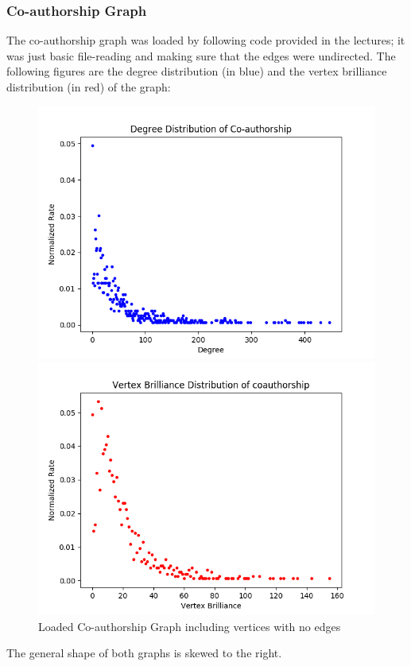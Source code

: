 \documentclass[11pt,a4paper,notitlepage]{article}
\begin{document}
\subsubsection*{Co-authorship Graph}
The co-authorship graph was loaded by following code provided in the lectures; it was just basic file-reading and making sure that the edges were undirected. The following figures are the degree distribution (in blue) and the vertex brilliance distribution (in red) of the graph:
\begin{figure}[H]
    \centering
    \begin{minipage}{0.49\textwidth}
        \centering
        \includegraphics[width=1\textwidth]{coauthorship-vertex-degree.png}
    \end{minipage}
    \begin{minipage}{0.49\textwidth}
        \centering
        \includegraphics[width=1\textwidth]{coauthorship-vertex-brilliance.png}
    \end{minipage} \hfill
    \caption{Loaded Co-authorship Graph including vertices with no edges}
\end{figure}
The general shape of both graphs is skewed to the right.
\end{document}
